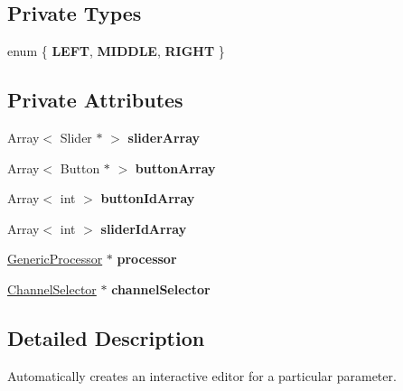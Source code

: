 \subsection*{Private Types}
\begin{DoxyCompactItemize}
\item 
enum \{ {\bfseries L\-E\-F\-T}, 
{\bfseries M\-I\-D\-D\-L\-E}, 
{\bfseries R\-I\-G\-H\-T}
 \}
\end{DoxyCompactItemize}
\subsection*{Private Attributes}
\begin{DoxyCompactItemize}
\item 
\hypertarget{classParameterEditor_a32f7ab3ffbe27803677295a51aa15a8e}{Array$<$ Slider $\ast$ $>$ {\bfseries slider\-Array}}\label{classParameterEditor_a32f7ab3ffbe27803677295a51aa15a8e}

\item 
\hypertarget{classParameterEditor_a386d3dd60d24695937c2013a969196c5}{Array$<$ Button $\ast$ $>$ {\bfseries button\-Array}}\label{classParameterEditor_a386d3dd60d24695937c2013a969196c5}

\item 
\hypertarget{classParameterEditor_ad44b9f967fdc823f8d079253dd49744c}{Array$<$ int $>$ {\bfseries button\-Id\-Array}}\label{classParameterEditor_ad44b9f967fdc823f8d079253dd49744c}

\item 
\hypertarget{classParameterEditor_a0b47ca4f8e1b04d8fa0e74f65202af57}{Array$<$ int $>$ {\bfseries slider\-Id\-Array}}\label{classParameterEditor_a0b47ca4f8e1b04d8fa0e74f65202af57}

\item 
\hypertarget{classParameterEditor_ae0cc3f3aa09a4e490891ba4f860544fd}{\hyperlink{classGenericProcessor}{Generic\-Processor} $\ast$ {\bfseries processor}}\label{classParameterEditor_ae0cc3f3aa09a4e490891ba4f860544fd}

\item 
\hypertarget{classParameterEditor_acc6ef739b4229d97fa45d026293296a9}{\hyperlink{classChannelSelector}{Channel\-Selector} $\ast$ {\bfseries channel\-Selector}}\label{classParameterEditor_acc6ef739b4229d97fa45d026293296a9}

\end{DoxyCompactItemize}


\subsection{Detailed Description}
Automatically creates an interactive editor for a particular parameter.

